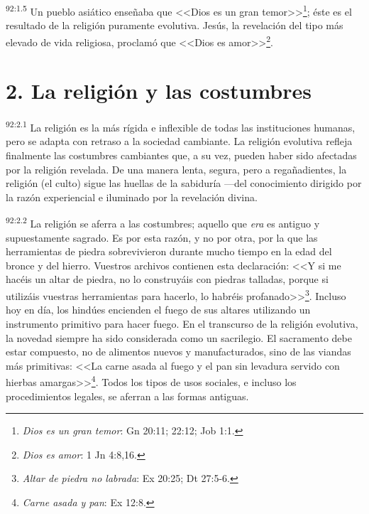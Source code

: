 \par
\textsuperscript{92:1.5} Un pueblo asiático enseñaba que <<Dios es un gran temor>>\footnote{\textit{Dios es un gran temor}: Gn 20:11; 22:12; Job 1:1.}; éste es el resultado de la religión puramente evolutiva. Jesús, la revelación del tipo más elevado de vida religiosa, proclamó que <<Dios es amor>>\footnote{\textit{Dios es amor}: 1 Jn 4:8,16.}.

\section*{2. La religión y las costumbres}
\par
\textsuperscript{92:2.1} La religión es la más rígida e inflexible de todas las instituciones humanas, pero se adapta con retraso a la sociedad cambiante. La religión evolutiva refleja finalmente las costumbres cambiantes que, a su vez, pueden haber sido afectadas por la religión revelada. De una manera lenta, segura, pero a regañadientes, la religión (el culto) sigue las huellas de la sabiduría ---del conocimiento dirigido por la razón experiencial e iluminado por la revelación divina.

\par
\textsuperscript{92:2.2} La religión se aferra a las costumbres; aquello que \textit{era} es antiguo y supuestamente sagrado. Es por esta razón, y no por otra, por la que las herramientas de piedra sobrevivieron durante mucho tiempo en la edad del bronce y del hierro. Vuestros archivos contienen esta declaración: <<Y si me hacéis un altar de piedra, no lo construyáis con piedras talladas, porque si utilizáis vuestras herramientas para hacerlo, lo habréis profanado>>\footnote{\textit{Altar de piedra no labrada}: Ex 20:25; Dt 27:5-6.}. Incluso hoy en día, los hindúes encienden el fuego de sus altares utilizando un instrumento primitivo para hacer fuego. En el transcurso de la religión evolutiva, la novedad siempre ha sido considerada como un sacrilegio. El sacramento debe estar compuesto, no de alimentos nuevos y manufacturados, sino de las viandas más primitivas: <<La carne asada al fuego y el pan sin levadura servido con hierbas amargas>>\footnote{\textit{Carne asada y pan}: Ex 12:8.}. Todos los tipos de usos sociales, e incluso los procedimientos legales, se aferran a las formas antiguas.

